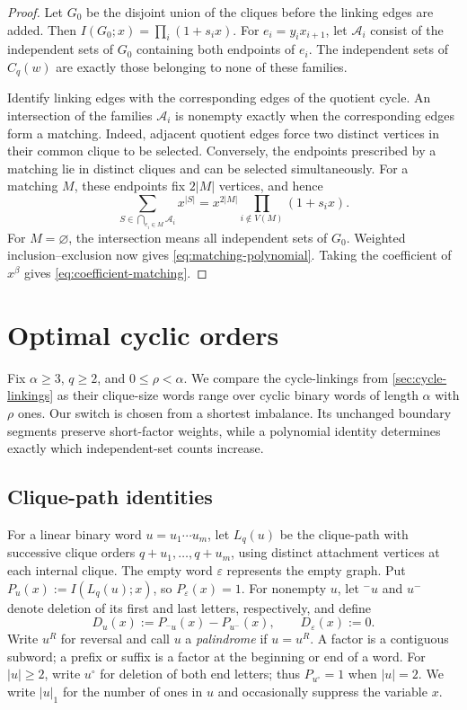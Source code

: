 \documentclass[11pt]{article}
\theoremstyle{definition}
\begin{document}
\begin{proof}
Let $G_0$ be the disjoint union of the cliques before the linking
edges are added. Then $I(G_0;x)=\prod_i(1+s_ix)$. For
$e_i=y_ix_{i+1}$, let $\mathcal A_i$ consist of the independent sets
of $G_0$ containing both endpoints of $e_i$. The independent sets of
$C_q(w)$ are exactly those belonging to none of these families.

Identify linking edges with the corresponding edges of the quotient
cycle. An intersection of the families $\mathcal A_i$ is nonempty
exactly when the corresponding edges form a matching. Indeed,
adjacent quotient edges force two distinct vertices in their common
clique to be selected. Conversely, the endpoints prescribed by a
matching lie in distinct cliques and can be selected simultaneously.
For a matching $M$, these endpoints fix $2|M|$ vertices, and hence
\[
 \sum_{S\in\bigcap_{e_i\in M}\mathcal A_i}x^{|S|}
 =x^{2|M|}\prod_{i\notin V(M)}(1+s_ix).
\]
For $M=\varnothing$, the intersection means all independent sets of
$G_0$. Weighted inclusion--exclusion now gives
\eqref{eq:matching-polynomial}. Taking the coefficient of $x^\beta$
gives \eqref{eq:coefficient-matching}.
\end{proof}


\section{Optimal cyclic orders}
\label{sec:block-reversals}
\label{sec:local-balance}

Fix $\alpha\ge3$, $q\ge2$, and $0\le\rho<\alpha$. We compare the
cycle-linkings from \cref{sec:cycle-linkings} as their clique-size
words range over cyclic binary words of length $\alpha$ with $\rho$
ones. Our switch is chosen from a shortest imbalance. Its unchanged
boundary segments preserve short-factor weights, while a polynomial
identity determines exactly which independent-set counts increase.

\subsection{Clique-path identities}

For a linear binary word $u=u_1\cdots u_m$, let $L_q(u)$ be the
clique-path with successive clique orders $q+u_1,\ldots,q+u_m$,
using distinct attachment vertices at each internal clique. The empty
word $\varepsilon$ represents the empty graph. Put
$P_u(x):=I(L_q(u);x)$, so $P_\varepsilon(x)=1$.
For nonempty $u$, let ${}^-u$ and $u^-$ denote deletion of its first
and last letters, respectively, and define
\begin{equation}\label{eq:D-def}
 D_u(x):=P_{{}^-u}(x)-P_{u^-}(x),
 \qquad D_\varepsilon(x):=0.
\end{equation}
Write $u^R$ for reversal and call $u$ a \emph{palindrome} if $u=u^R$.
A factor is a contiguous subword; a prefix or suffix is a factor at
the beginning or end of a word.
For $|u|\ge2$, write $u^\circ$ for deletion of both end letters;
thus $P_{u^\circ}=1$ when $|u|=2$. We write $|u|_1$ for the number
of ones in $u$ and occasionally suppress the variable $x$.
\end{document}
